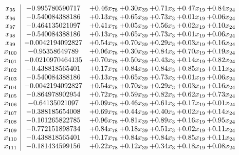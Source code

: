 \documentclass[8pt]{article}
\begin{document}
\[\begin{array}{c| c c@{\hskip 2pt} c@{\hskip 2pt} c@{\hskip 2pt} c@{\hskip 2pt} c@{\hskip 2pt} }
 x_{95}   &  -0.995780590717 & +  0.46 x_{78} & +  0.30 x_{39} & +  0.71 x_{3} & +  0.47 x_{19} & +  0.84 x_{24}\\
 x_{96}   &  -0.540084388186 & +  0.13 x_{78} & +  0.65 x_{39} & +  0.73 x_{3} & +  0.01 x_{19} & +  0.06 x_{24}\\
 x_{97}   &  -0.464135021097 & +  0.41 x_{78} & +  0.05 x_{39} & +  0.56 x_{3} & +  0.02 x_{19} & +  0.10 x_{24}\\
 x_{98}   &  -0.540084388186 & +  0.13 x_{78} & +  0.65 x_{39} & +  0.73 x_{3} & +  0.01 x_{19} & +  0.06 x_{24}\\
 x_{99}   &  -0.0042194092827 & +  0.54 x_{78} & +  0.70 x_{39} & +  0.29 x_{3} & +  0.03 x_{19} & +  0.16 x_{24}\\
 x_{100}   &  -0.95358649789 & +  0.06 x_{78} & +  0.30 x_{39} & +  0.84 x_{3} & +  0.70 x_{19} & +  0.19 x_{24}\\
 x_{101}   &  -0.0210970464135 & +  0.70 x_{78} & +  0.50 x_{39} & +  0.43 x_{3} & +  0.14 x_{19} & +  0.82 x_{24}\\
 x_{102}   &  -0.438818565401 & +  0.17 x_{78} & +  0.84 x_{39} & +  0.84 x_{3} & +  0.85 x_{19} & +  0.11 x_{24}\\
 x_{103}   &  -0.540084388186 & +  0.13 x_{78} & +  0.65 x_{39} & +  0.73 x_{3} & +  0.01 x_{19} & +  0.06 x_{24}\\
 x_{104}   &  -0.0042194092827 & +  0.54 x_{78} & +  0.70 x_{39} & +  0.29 x_{3} & +  0.03 x_{19} & +  0.16 x_{24}\\
 x_{105}   &  -0.864978902954 & +  0.72 x_{78} & +  0.59 x_{39} & +  0.82 x_{3} & +  0.62 x_{19} & +  0.73 x_{24}\\
 x_{106}   &  -0.64135021097 & +  0.09 x_{78} & +  0.46 x_{39} & +  0.61 x_{3} & +  0.17 x_{19} & +  0.01 x_{24}\\
 x_{107}   &  -0.388185654008 & +  0.69 x_{78} & +  0.44 x_{39} & +  0.40 x_{3} & +  0.02 x_{19} & +  0.14 x_{24}\\
 x_{108}   &  -0.101265822785 & +  0.96 x_{78} & +  0.81 x_{39} & +  0.89 x_{3} & +  0.16 x_{19} & +  0.95 x_{24}\\
 x_{109}   &  -0.772151898734 & +  0.84 x_{78} & +  0.18 x_{39} & +  0.51 x_{3} & +  0.02 x_{19} & +  0.11 x_{24}\\
 x_{110}   &  -0.438818565401 & +  0.17 x_{78} & +  0.84 x_{39} & +  0.84 x_{3} & +  0.85 x_{19} & +  0.11 x_{24}\\
 x_{111}   &  -0.181434599156 & +  0.22 x_{78} & +  0.12 x_{39} & +  0.34 x_{3} & +  0.18 x_{19} & +  0.08 x_{24}\\

\end{array}\]
\end{document}
